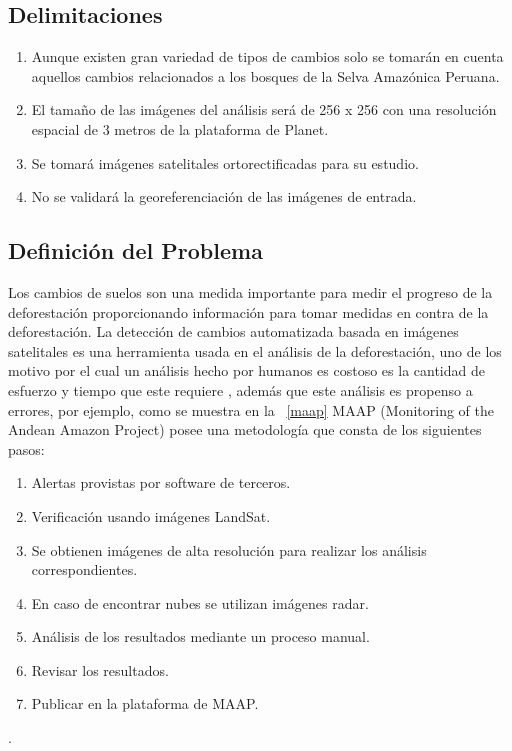 \subsection{Delimitaciones}
\begin{enumerate}
    \item Aunque existen gran variedad de tipos de cambios solo se tomarán en cuenta aquellos cambios relacionados a los bosques de la Selva Amazónica Peruana.
    \item El tamaño de las imágenes del análisis será de 256 x 256 con una resolución espacial de 3 metros de la plataforma de Planet.
    \item Se tomará imágenes satelitales ortorectificadas para su estudio.
    \item No se validará la georeferenciación de las imágenes de entrada.
    
\end{enumerate}


\subsection{Definición del Problema}

Los cambios de suelos son una medida importante para medir el progreso de la deforestación proporcionando información para tomar medidas en contra de la deforestación. La detección de cambios automatizada basada en imágenes satelitales es una herramienta usada en el análisis de la deforestación, uno de los motivo por el cual un análisis hecho por humanos es costoso es la cantidad de esfuerzo y tiempo que este requiere \cite{SINGH1989}, además que este análisis es propenso a errores, por ejemplo, como se muestra en la \figureautorefname ~\ref{maap} MAAP (Monitoring of the Andean Amazon Project) posee una metodología que consta de los siguientes pasos: 
\begin{enumerate}
    \item Alertas provistas por software de terceros.
    \item Verificación usando imágenes LandSat.
    \item Se obtienen imágenes de alta resolución  para realizar los análisis correspondientes.
    \item En caso de encontrar nubes se utilizan imágenes radar.
    \item Análisis de los resultados mediante un proceso manual.
    \item Revisar los resultados.
    \item Publicar en la plataforma de \gls{MAAP}.
\end{enumerate}{}
.

